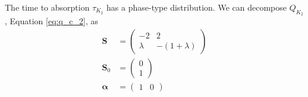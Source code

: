 The time to absorption $\tau_{K_2}$ has a phase-type distribution.
We can decompose $Q_{K_2}$, Equation \eqref{eq:q_c_2}, as
\begin{align*}
    \mathbf{S} &= \begin{pmatrix}
        -2 & 2\\
        \lambda & - (1 + \lambda)
    \end{pmatrix}\\
    \mathbf{S}_0 &= \begin{pmatrix}
        0\\
        1
    \end{pmatrix}\\
    \boldsymbol{\alpha} &= \begin{pmatrix}
    1 & 0
    \end{pmatrix}
\end{align*}

